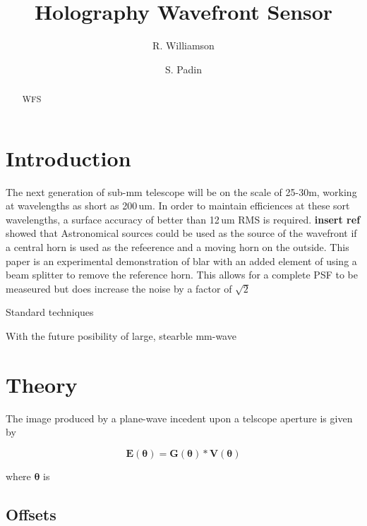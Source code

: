 \documentclass[osajnl,twocolumn,showpacs,superscriptaddress,11pt]{revtex4-1} %
\begin{document}
\title{Holography Wavefront Sensor}

\author{R. Williamson}
\author{S. Padin}


\begin{abstract} WFS
\end{abstract}


\maketitle %

\section{Introduction}

The next generation of sub-mm telescope will be on the scale of 25-30m, working at wavelengths as short as 200\,um.  In order to maintain efficiences at these sort wavelengths, a surface accuracy of better than 12\,um RMS is required. {\bf insert ref} showed that Astronomical sources could be used as the source of the wavefront if a central horn is used as the refeerence and a moving horn on the outside.  This paper is an experimental demonstration of blar with an added element of using a beam splitter to remove the reference horn. This allows for a complete PSF to be measeured but does increase the noise by a factor of $\sqrt{2}$

Standard techniques  

With the future posibility of large, stearble mm-wave 

\section{Theory}

The image produced by a plane-wave incedent upon a telscope aperture is given by

$$ \mathbf{E}(\pmb\theta) = \mathbf{G}(\pmb\theta) \ast \mathbf{V}(\pmb\theta) $$

where $\pmb\theta$ is
\subsection{Offsets}
\end{document}
